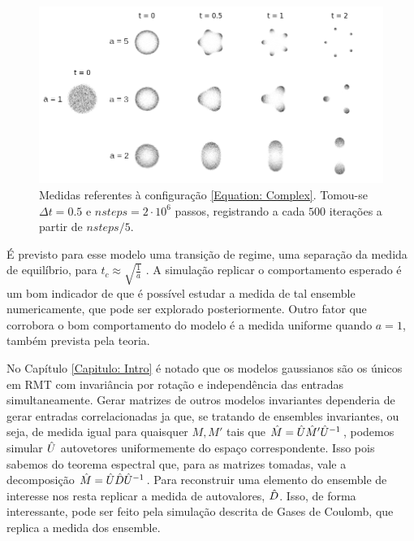 \begin{figure}[ht]
	\centering
	\includegraphics[width=\textwidth]{Assets/complexPotential.png}
	\caption{Medidas referentes à configuração \ref{Equation: Complex}. Tomou-se $\Delta t = 0.5$ e $nsteps = 2\cdot10^6$ passos, registrando a cada $500$ iterações a partir de $nsteps/5$.}
	\label{Figura: Complex}
\end{figure}

É previsto para esse modelo uma transição de regime, uma separação da medida de equilíbrio, para $t_c \approx \sqrt{\frac{1}{a}}$ \cite{balogh2016orthogonal}. A simulação replicar o comportamento esperado é um bom indicador de que é possível estudar a medida de tal ensemble numericamente, que pode ser explorado posteriormente. Outro fator que corrobora o bom comportamento do modelo é a medida uniforme quando $a=1$, também prevista pela teoria.

No Capítulo \ref{Capitulo: Intro} é notado que os modelos gaussianos são os únicos em RMT com invariância por rotação e independência das entradas simultaneamente. Gerar matrizes de outros modelos invariantes dependeria de gerar entradas correlacionadas ja que, se tratando de ensembles invariantes, ou seja, de medida igual para quaisquer $M, M'$ tais que $\hat M = \hat U \hat M' \hat U^{-1}$, podemos simular $\hat U$ autovetores uniformemente do espaço correspondente. Isso pois sabemos do teorema espectral que, para as matrizes tomadas, vale a decomposição $\hat M = \hat U \hat D \hat U^{-1}$. Para reconstruir uma elemento do ensemble de interesse nos resta replicar a medida de autovalores, $\hat D$. Isso, de forma interessante, pode ser feito pela simulação descrita de Gases de Coulomb, que replica a medida dos ensemble.

